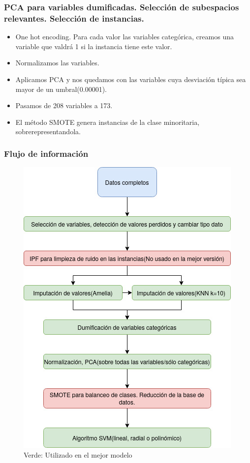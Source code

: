 \begin{frame}
\frametitle{PCA para variables dumificadas. Selección de subespacios relevantes. Selección de instancias.}

\begin{itemize}
	\item One hot encoding. Para cada valor las variables categórica, creamos una variable que valdrá 1 si la instancia tiene este valor.
	
	\item Normalizamos las variables.
	\item Aplicamos PCA\cite{pca} y nos quedamos con las variables cuya desviación típica sea mayor de un umbral(0.00001).
	\item Pasamos de 208 variables a 173.

	\item El método SMOTE\cite{smote} genera instancias de la clase minoritaria, sobrerepresentandola. 

\end{itemize}
\end{frame}

\begin{frame}
\frametitle{Flujo de información}
\begin{figure}
	\centering
	\includegraphics[width=0.5\linewidth]{figures/DiagramaFlujoSVM}
	\caption{Verde: Utilizado en el mejor modelo}
	\label{fig:diagramaflujosvm}
\end{figure}


\end{frame}


